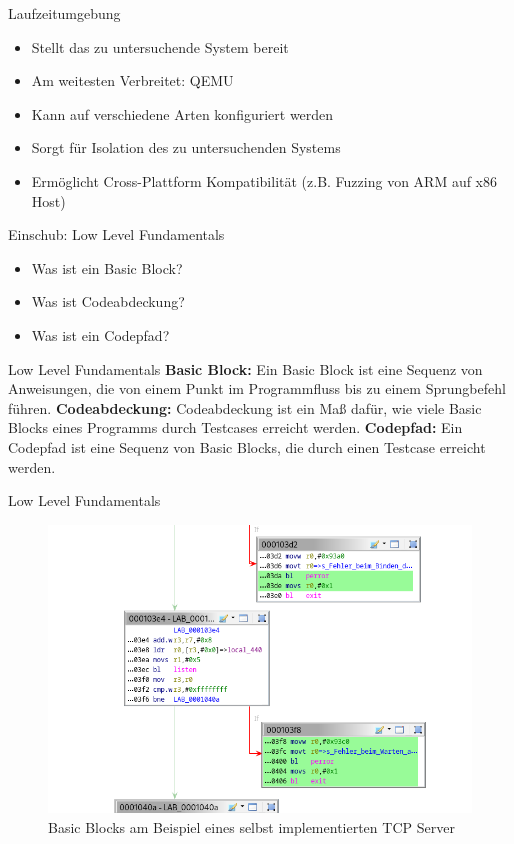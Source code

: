 \begin{frame}{Laufzeitumgebung}
    \begin{itemize}
        \item Stellt das zu untersuchende System bereit
        \item Am weitesten Verbreitet: QEMU
        \item Kann auf verschiedene Arten konfiguriert werden
        \item Sorgt für Isolation des zu untersuchenden Systems
        \item Ermöglicht Cross-Plattform Kompatibilität (z.B. Fuzzing von ARM auf x86 Host)
    \end{itemize}
\end{frame}
\begin{frame}{Einschub: Low Level Fundamentals}
    \begin{itemize}
        \item Was ist ein Basic Block?
        \item Was ist Codeabdeckung?
        \item Was ist ein Codepfad?
    \end{itemize}
\end{frame}
\begin{frame}{Low Level Fundamentals}
    \textbf{Basic Block:} Ein Basic Block ist eine Sequenz von Anweisungen, die von einem Punkt im Programmfluss bis zu einem Sprungbefehl führen.\break
    \textbf{Codeabdeckung:} Codeabdeckung ist ein Maß dafür, wie viele Basic Blocks eines Programms durch Testcases erreicht werden.\break
    \textbf{Codepfad:} Ein Codepfad ist eine Sequenz von Basic Blocks, die durch einen Testcase erreicht werden.
\end{frame}
\begin{frame}{Low Level Fundamentals}
    \begin{figure}[H]
        \centering
        \includegraphics[width=\textwidth]{res/basic_block_example}
        \caption[Basic Blocks am Beispiel eines selbst implementierten TCP Server]{Basic Blocks am Beispiel eines selbst implementierten TCP Server}
        \label{fig:basic-blocks}
    \end{figure}
\end{frame}

